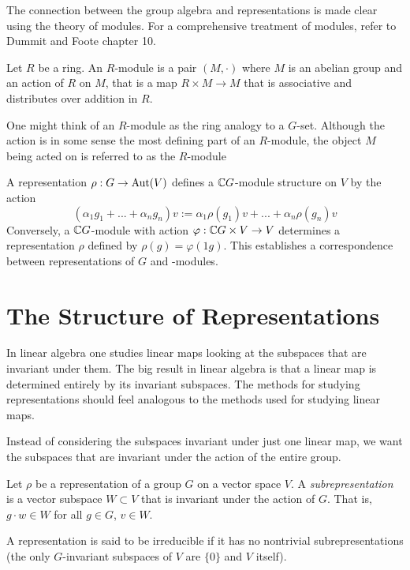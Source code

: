 The connection between the group algebra and representations is made clear using the theory of modules. For a 
comprehensive treatment of modules, refer to Dummit and Foote \cite{foote} chapter 10.

    \begin{definition}
        Let $R$ be a ring. An $R$-module is a pair $(M, \cdot)$ where $M$ is an abelian group and an action of $R$ 
        on $M$, that is a map $R \times M \rightarrow M$ that is associative and distributes over addition in $R$.

        One might think of an $R$-module as the ring analogy to a $G$-set. Although the action is in some sense the 
        most defining part of an $R$-module, the object $M$ being acted on is referred to as the $R$-module
     \end{definition}

A representation $\rho : G \rightarrow \operatorname{Aut}(V)$ defines a $\mathbb{C} G$-module structure on $V$ by the action
\[
    (\alpha_1g_1 + ... + \alpha_ng_n) v := \alpha_1\rho(g_1)v + ...+ \alpha_n\rho(g_n)v
\]
Conversely, a $\mathbb{C} G$-module with action $\varphi : \mathbb{C} G \times V \rightarrow V$ determines a representation $\rho$ 
defined by $\rho(g) = \varphi(1g)$. This establishes a correspondence between representations of $G$ and 
\CG-modules.


\section{The Structure of Representations}




In linear algebra one studies linear maps looking at the subspaces that are invariant under them. The big result in 
linear algebra is that a linear map is determined entirely by its invariant subspaces. The methods for studying 
representations should feel analogous to the methods used for studying linear maps. 

Instead of considering the subspaces invariant under just one linear map, we want the subspaces that are invariant 
under the action of the entire group. 

\begin{definition}
    Let $\rho$ be a representation of a group $G$ on a vector space $V$. A \emph{subrepresentation} is a vector 
    subspace $W \subset V$ that is invariant under the action of $G$. That is, $g\cdot w \in W$ for all $g \in G$, 
    $v \in W$.
 

    A representation is said to be irreducible if it has no nontrivial subrepresentations (the only $G$-invariant 
    subspaces of $V$ are $\{ 0 \}$ and $V$ itself).
\end{definition}

